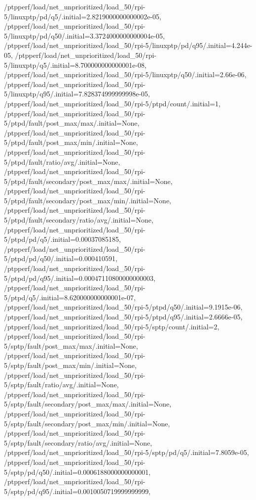 {    /ptpperf/load/net_unprioritized/load_50/rpi-5/linuxptp/pd/q5/.initial=2.8219000000000002e-05,
    /ptpperf/load/net_unprioritized/load_50/rpi-5/linuxptp/pd/q50/.initial=3.3724000000000004e-05,
    /ptpperf/load/net_unprioritized/load_50/rpi-5/linuxptp/pd/q95/.initial=4.244e-05,
    /ptpperf/load/net_unprioritized/load_50/rpi-5/linuxptp/q5/.initial=8.700000000000001e-08,
    /ptpperf/load/net_unprioritized/load_50/rpi-5/linuxptp/q50/.initial=2.66e-06,
    /ptpperf/load/net_unprioritized/load_50/rpi-5/linuxptp/q95/.initial=7.828374999999998e-05,
    /ptpperf/load/net_unprioritized/load_50/rpi-5/ptpd/count/.initial=1,
    /ptpperf/load/net_unprioritized/load_50/rpi-5/ptpd/fault/post_max/max/.initial=None,
    /ptpperf/load/net_unprioritized/load_50/rpi-5/ptpd/fault/post_max/min/.initial=None,
    /ptpperf/load/net_unprioritized/load_50/rpi-5/ptpd/fault/ratio/avg/.initial=None,
    /ptpperf/load/net_unprioritized/load_50/rpi-5/ptpd/fault/secondary/post_max/max/.initial=None,
    /ptpperf/load/net_unprioritized/load_50/rpi-5/ptpd/fault/secondary/post_max/min/.initial=None,
    /ptpperf/load/net_unprioritized/load_50/rpi-5/ptpd/fault/secondary/ratio/avg/.initial=None,
    /ptpperf/load/net_unprioritized/load_50/rpi-5/ptpd/pd/q5/.initial=0.00037085185,
    /ptpperf/load/net_unprioritized/load_50/rpi-5/ptpd/pd/q50/.initial=0.000410591,
    /ptpperf/load/net_unprioritized/load_50/rpi-5/ptpd/pd/q95/.initial=0.00047110800000000003,
    /ptpperf/load/net_unprioritized/load_50/rpi-5/ptpd/q5/.initial=8.620000000000001e-07,
    /ptpperf/load/net_unprioritized/load_50/rpi-5/ptpd/q50/.initial=9.1915e-06,
    /ptpperf/load/net_unprioritized/load_50/rpi-5/ptpd/q95/.initial=2.6666e-05,
    /ptpperf/load/net_unprioritized/load_50/rpi-5/sptp/count/.initial=2,
    /ptpperf/load/net_unprioritized/load_50/rpi-5/sptp/fault/post_max/max/.initial=None,
    /ptpperf/load/net_unprioritized/load_50/rpi-5/sptp/fault/post_max/min/.initial=None,
    /ptpperf/load/net_unprioritized/load_50/rpi-5/sptp/fault/ratio/avg/.initial=None,
    /ptpperf/load/net_unprioritized/load_50/rpi-5/sptp/fault/secondary/post_max/max/.initial=None,
    /ptpperf/load/net_unprioritized/load_50/rpi-5/sptp/fault/secondary/post_max/min/.initial=None,
    /ptpperf/load/net_unprioritized/load_50/rpi-5/sptp/fault/secondary/ratio/avg/.initial=None,
    /ptpperf/load/net_unprioritized/load_50/rpi-5/sptp/pd/q5/.initial=7.8059e-05,
    /ptpperf/load/net_unprioritized/load_50/rpi-5/sptp/pd/q50/.initial=0.0006188000000000001,
    /ptpperf/load/net_unprioritized/load_50/rpi-5/sptp/pd/q95/.initial=0.0010050719999999999,
}
